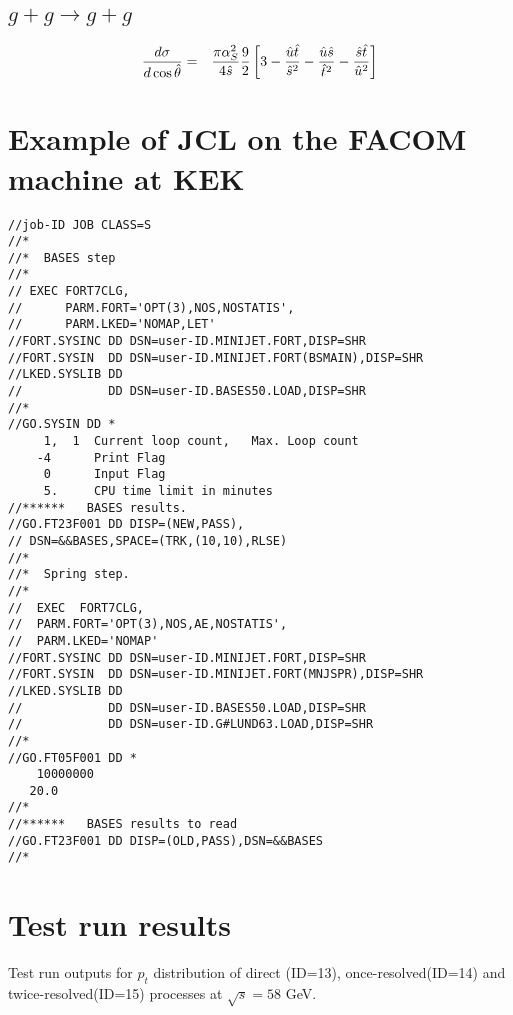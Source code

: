 \subsection{$g + g \rightarrow g + g $}
\begin{eqnarray} 
{d\sigma \over d\cos\hat{\theta}} &=&
{\pi\alpha_S^2 \over 4\hat{s} } 
 \frac{9}{2}\left[ 3 - {\hat{u}\hat{t} \over \hat{s}^2 }
- {\hat{u}\hat{s} \over \hat{t}^2 } 
- {\hat{s}\hat{t} \over \hat{u}^2 } \right] \label{EQA12}
\end{eqnarray}

\section{Example of JCL on the FACOM machine at KEK}
\label{JCLEXAMPLE}
\begin{verbatim}
//job-ID JOB CLASS=S
//*
//*  BASES step
//*
// EXEC FORT7CLG,
//      PARM.FORT='OPT(3),NOS,NOSTATIS',
//      PARM.LKED='NOMAP,LET'
//FORT.SYSINC DD DSN=user-ID.MINIJET.FORT,DISP=SHR
//FORT.SYSIN  DD DSN=user-ID.MINIJET.FORT(BSMAIN),DISP=SHR
//LKED.SYSLIB DD
//            DD DSN=user-ID.BASES50.LOAD,DISP=SHR
//*
//GO.SYSIN DD *
     1,  1  Current loop count,   Max. Loop count
    -4      Print Flag
     0      Input Flag
     5.     CPU time limit in minutes
//******   BASES results.
//GO.FT23F001 DD DISP=(NEW,PASS),
// DSN=&&BASES,SPACE=(TRK,(10,10),RLSE)
//*
//*  Spring step.
//*
//  EXEC  FORT7CLG,
//  PARM.FORT='OPT(3),NOS,AE,NOSTATIS',
//  PARM.LKED='NOMAP'
//FORT.SYSINC DD DSN=user-ID.MINIJET.FORT,DISP=SHR
//FORT.SYSIN  DD DSN=user-ID.MINIJET.FORT(MNJSPR),DISP=SHR
//LKED.SYSLIB DD
//            DD DSN=user-ID.BASES50.LOAD,DISP=SHR
//            DD DSN=user-ID.G#LUND63.LOAD,DISP=SHR
//*
//GO.FT05F001 DD *
    10000000
   20.0
//*
//******   BASES results to read
//GO.FT23F001 DD DISP=(OLD,PASS),DSN=&&BASES
//*
\end{verbatim}

\newpage
\section{Test run results}

Test run outputs for $p_t$ distribution of 
direct (ID=13), once-resolved(ID=14) and twice-resolved(ID=15)
processes at $\sqrt{s}=58$ GeV.

